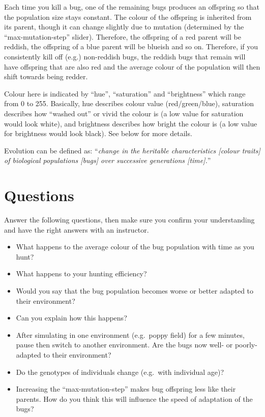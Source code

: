\documentclass[
  a4paper]{book}
\providecommand{\tightlist}{%
  \setlength{\itemsep}{0pt}\setlength{\parskip}{0pt}}
\begin{document}
Each time you kill a bug, one of the remaining bugs produces an offspring so that the population size stays constant. The colour of the offspring is inherited from its parent, though it can change slightly due to mutation (determined by the ``max-mutation-step'' slider). Therefore, the offspring of a red parent will be reddish, the offspring of a blue parent will be blueish and so on. Therefore, if you consistently kill off (e.g.) non-reddish bugs, the reddish bugs that remain will have offspring that are also red and the average colour of the population will then shift towards being redder.

Colour here is indicated by ``hue'', ``saturation'' and ``brightness'' which range from 0 to 255. Basically, hue describes colour value (red/green/blue), saturation describes how ``washed out'' or vivid the colour is (a low value for saturation would look white), and brightness describes how bright the colour is (a low value for brightness would look black). See below for more details.

Evolution can be defined as: ``\emph{change in the heritable characteristics {[}colour traits{]} of biological populations {[}bugs{]} over successive generations {[}time{]}.}''

\section{Questions}\label{questions-1}

Answer the following questions, then make sure you confirm your understanding and have the right answers with an instructor.

\begin{itemize}
\tightlist
\item
  What happens to the average colour of the bug population with time as you hunt?
\item
  What happens to your hunting efficiency?
\item
  Would you say that the bug population becomes worse or better adapted to their environment?
\item
  Can you explain how this happens?
\item
  After simulating in one environment (e.g.~poppy field) for a few minutes, pause then switch to another environment. Are the bugs now well- or poorly-adapted to their environment?
\item
  Do the genotypes of individuals change (e.g.~with individual age)?
\item
  Increasing the ``max-mutation-step'' makes bug offspring less like their parents. How do you think this will influence the speed of adaptation of the bugs?
\end{itemize}
\end{document}
